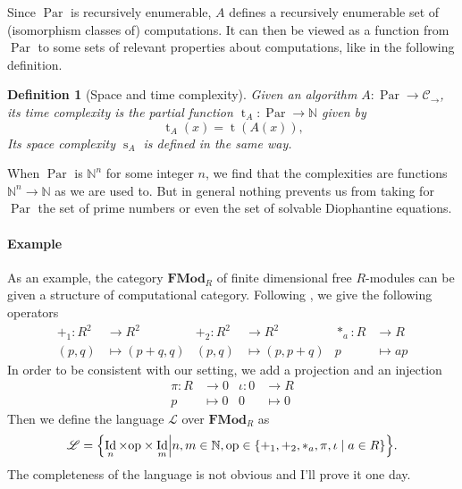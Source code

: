 \documentclass{article}
\newcommand{\cat}[1]{\mathscr{#1}}
\newcommand{\lcat}[1]{\mathbf{#1}}
\newcommand{\C}{\cat{C}}
\renewcommand{\L}{\cat{L}}
\DeclareMathOperator{\Id}{Id}
\newcommand{\N}{\mathbb{N}}
\newcommand{\ra}{\rightarrow}
\DeclareMathOperator{\Time}{t}
\DeclareMathOperator{\Space}{s}
\DeclareMathOperator{\Par}{Par}
\newtheorem{definition}{Definition}
\begin{document}
  Since $\Par$ is recursively enumerable, $A$ defines a recursively
  enumerable set of (isomorphism classes of) computations. It can then
  be viewed as a function from $\Par$ to some sets of relevant
  properties about computations, like in the following definition.

  \begin{definition}[Space and time complexity]
    Given an algorithm $A:\Par\ra\C_\ra$, its \emph{time complexity}
    is the partial function ${\Time_A:\Par\ra\N}$ given by
    \begin{equation*}
      \Time_A(x) = \Time(A(x)) \text{,}
    \end{equation*}
    Its \emph{space complexity} $\Space_A$ is defined in the same way.
  \end{definition}

  When $\Par$ is $\N^n$ for some integer $n$, we find that the
  complexities are functions $\N^n\ra\N$ as we are used to. But in
  general nothing prevents us from taking for $\Par$ the set of prime
  numbers or even the set of solvable Diophantine equations.

  \paragraph{Example}
  As an example, the category $\lcat{FMod}_R$ of finite dimensional
  free $R$-modules can be given a structure of computational
  category. Following \cite{BLS03}, we give the following operators
  \begin{align*}
    +_1 : R^2 &\ra R^2         &   +_2 : R^2&\ra R^2       &  *_a : R&\ra R\\
         (p,q)&\mapsto(p+q,q)  &      (p,q)&\mapsto(p,p+q) &       p&\mapsto ap
  \end{align*}
  In order to be consistent with our setting, we add a projection and
  an injection
  \begin{align*}
    \pi : R&\ra 0     &  \iota : 0&\ra R   \\
          p&\mapsto0  &          0&\mapsto0
  \end{align*}
  Then we define the language $\L$ over $\lcat{FMod}_R$ as 
  \begin{equation}
    \label{eq:linlang}
    \L = \Bigl\{\Id_n\times\mathrm{op}\times\Id_m \Bigl\lvert
    n,m\in\N, \mathrm{op}\in\{+_1,+_2,*_a,\pi,\iota\;|\;a\in R\} \Bigr\}
    \text{.}
  \end{equation}
  The completeness of the language is not obvious and I'll prove it
  one day.
\end{document}
